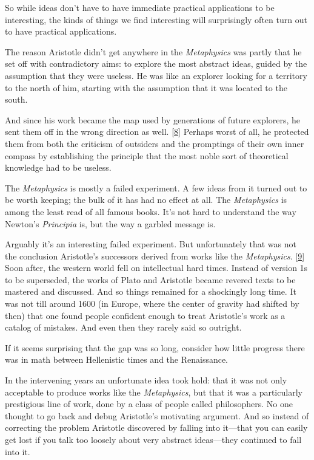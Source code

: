 So while ideas don't have to have immediate practical applications to be
interesting, the kinds of things we find interesting will surprisingly
often turn out to have practical applications.

The reason Aristotle didn't get anywhere in the \emph{Metaphysics} was
partly that he set off with contradictory aims: to explore the most
abstract ideas, guided by the assumption that they were useless. He was
like an explorer looking for a territory to the north of him, starting
with the assumption that it was located to the south.

And since his work became the map used by generations of future
explorers, he sent them off in the wrong direction as well.
{[}\hyperref[f8n]{8}{]} Perhaps worst of all, he protected them from
both the criticism of outsiders and the promptings of their own inner
compass by establishing the principle that the most noble sort of
theoretical knowledge had to be useless.

The \emph{Metaphysics} is mostly a failed experiment. A few ideas from
it turned out to be worth keeping; the bulk of it has had no effect at
all. The \emph{Metaphysics} is among the least read of all famous books.
It's not hard to understand the way Newton's \emph{Principia} is, but
the way a garbled message is.

Arguably it's an interesting failed experiment. But unfortunately that
was not the conclusion Aristotle's successors derived from works like
the \emph{Metaphysics}. {[}\hyperref[f9n]{9}{]} Soon after, the western
world fell on intellectual hard times. Instead of version 1s to be
superseded, the works of Plato and Aristotle became revered texts to be
mastered and discussed. And so things remained for a shockingly long
time. It was not till around 1600 (in Europe, where the center of
gravity had shifted by then) that one found people confident enough to
treat Aristotle's work as a catalog of mistakes. And even then they
rarely said so outright.

If it seems surprising that the gap was so long, consider how little
progress there was in math between Hellenistic times and the
Renaissance.

In the intervening years an unfortunate idea took hold: that it was not
only acceptable to produce works like the \emph{Metaphysics}, but that
it was a particularly prestigious line of work, done by a class of
people called philosophers. No one thought to go back and debug
Aristotle's motivating argument. And so instead of correcting the
problem Aristotle discovered by falling into it---that you can easily
get lost if you talk too loosely about very abstract ideas---they
continued to fall into it.

